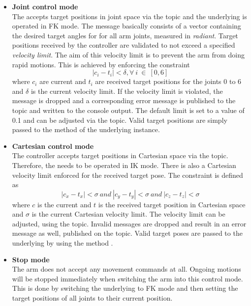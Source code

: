 \begin{itemize}

\item \textbf{Joint control mode} \\
The  accepts target positions in joint space via the  topic and the underlying  is operated in FK mode. The message basically consists of a vector containing the desired target angles for for all arm joints, measured in \emph{radiant}. Target positions received by the controller are validated to not exceed a specified \emph{velocity limit}. The aim of this velocity limit is to prevent the arm from doing rapid motions. This is achieved by enforcing the constraint
\begin{equation}
  |c_{i}-t_{i}|<\delta, \forall ~i~\in~[0,6]
\end{equation}
where $c_{i}$ are current and $t_{i}$ are received target positions for the joints 0 to 6 and $\delta$ is the current velocity limit. If the velocity limit is violated, the message is dropped and a corresponding error message is published to the  topic and written to the console output. The default limit is set to a value of 0.1 and can be adjusted via the  topic. Valid target positions are simply passed to the  method of the underlying  instance.

\item \textbf{Cartesian control mode} \\
The controller accepts target positions in Cartesian space via the  topic. Therefore, the  needs to be operated in IK mode. There is also a Cartesian velocity limit enforced for the received target pose. The constraint is defined as
\begin{equation}
  |c_{x}-t_{x}|<\sigma ~and~ |c_{y}-t_{y}|<\sigma ~and~ |c_{z}-t_{z}|<\sigma
\end{equation}
where $c$ is the current and $t$ is the received target position in Cartesian space and $\sigma$ is the current Cartesian velocity limit. The velocity limit can be adjusted, using the  topic. Invalid messages are dropped and result in an error message as well, published on the  topic. Valid target poses are passed to the underlying  by using the method .

\item \textbf{Stop mode} \\
The arm does not accept any movement commands at all. Ongoing motions will be stopped immediately when switching the arm into this control mode. This is done by switching the underlying  to FK mode and then setting the target positions of all joints to their current position.


\end{itemize}
